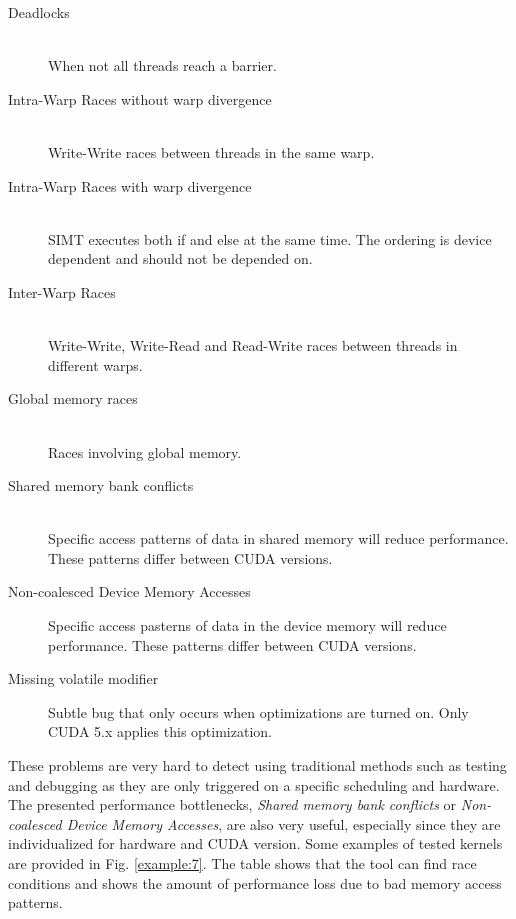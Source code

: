 \documentclass[10pt]{llncs}
\begin{document}
\begin{description}
	\item[Deadlocks] \hfill \\
		When not all threads reach a barrier.
	\item[Intra-Warp Races without warp divergence]  \hfill \\
		Write-Write races between threads in the same warp.
	\item[Intra-Warp Races with warp divergence] \hfill \\
		SIMT executes both if and else at the same time. The ordering is device dependent and should not be depended on.
	\item[Inter-Warp Races] \hfill \\
		Write-Write, Write-Read and Read-Write races between threads in different warps.
	\item[Global memory races] \hfill \\
		Races involving global memory.
	\item[Shared memory bank conflicts] \hfill \\
		Specific access patterns of data in shared memory will reduce performance. These patterns differ between CUDA versions.
	\item[Non-coalesced Device Memory Accesses]
		Specific access pasterns of data in the device memory will reduce performance. These patterns differ between CUDA versions.
	\item[Missing volatile modifier]
		Subtle bug that only occurs when optimizations are turned on. Only CUDA 5.x applies this optimization.
\end{description}

These problems are very hard to detect using traditional methods such as testing and debugging as they are only triggered on a specific scheduling and hardware. The presented performance bottlenecks, \emph{Shared memory bank conflicts} or \emph{Non-coalesced Device Memory Accesses}, are also very useful, especially since they are individualized for hardware and CUDA version.  Some examples of tested kernels are provided in Fig. \ref{example:7}. The table shows that the tool can find race conditions and shows the amount of performance loss due to bad memory access patterns.
\end{document}

